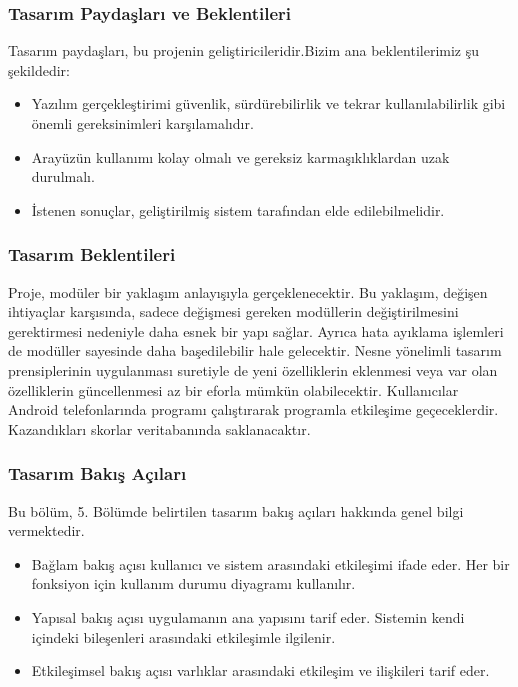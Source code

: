 \documentclass[12pt,a4paper]{article}
\begin{document}
   \subsubsection{Tasarım Paydaşları ve Beklentileri}
   Tasarım paydaşları, bu projenin geliştiricileridir.Bizim ana beklentilerimiz şu şekildedir:
   \begin{itemize}
      \item Yazılım gerçekleştirimi güvenlik, sürdürebilirlik ve tekrar kullanılabilirlik gibi önemli gereksinimleri karşılamalıdır.
      \item Arayüzün kullanımı kolay olmalı ve gereksiz karmaşıklıklardan uzak durulmalı.
      \item İstenen sonuçlar, geliştirilmiş sistem tarafından elde edilebilmelidir.
   \end{itemize}

   \subsubsection{Tasarım Beklentileri}
   Proje, modüler bir yaklaşım anlayışıyla gerçeklenecektir. Bu yaklaşım, değişen ihtiyaçlar karşısında, sadece değişmesi gereken modüllerin değiştirilmesini gerektirmesi nedeniyle daha esnek bir yapı sağlar. Ayrıca hata ayıklama işlemleri de modüller sayesinde daha başedilebilir hale gelecektir. Nesne yönelimli tasarım prensiplerinin uygulanması suretiyle de yeni özelliklerin eklenmesi veya var olan özelliklerin güncellenmesi az bir eforla mümkün olabilecektir. Kullanıcılar Android telefonlarında programı çalıştırarak programla etkileşime geçeceklerdir. Kazandıkları skorlar veritabanında saklanacaktır. 

   \subsubsection{Tasarım Bakış Açıları}
   Bu bölüm, 5. Bölümde belirtilen tasarım bakış açıları hakkında genel bilgi vermektedir.
   \begin{itemize}
      \item Bağlam bakış açısı kullanıcı ve sistem arasındaki etkileşimi ifade eder. Her bir fonksiyon için kullanım durumu diyagramı kullanılır.
      \item Yapısal bakış açısı uygulamanın ana yapısını tarif eder. Sistemin kendi içindeki bileşenleri arasındaki etkileşimle ilgilenir.
      \item Etkileşimsel bakış açısı varlıklar arasındaki etkileşim ve ilişkileri tarif eder. 
   \end{itemize}
\end{document}
